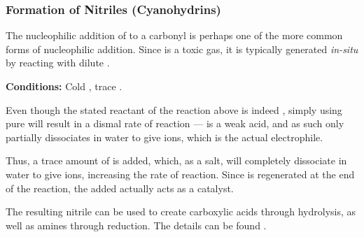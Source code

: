 			\subsubsection{Formation of Nitriles (Cyanohydrins)}

				The nucleophilic addition of  to a carbonyl is perhaps one of the more common forms of nucleophilic addition.
				Since  is a toxic gas, it is typically generated \textit{in-situ} by reacting  with dilute .


				\vspace{-5mm}


				\vspace{1.5em}
				\vbox{\textbf{Conditions:}	\tabto{35mm}Cold , trace .}


				Even though the stated reactant of the reaction above is indeed , simply using pure  will result in a dismal
				rate of reaction ––  is a weak acid, and as such only partially dissociates in water to give  ions, which is
				the actual electrophile.

				Thus, a trace amount of  is added, which, as a salt, will completely dissociate in water to give  ions,
				increasing the rate of reaction. Since  is regenerated at the end of the reaction, the  added actually
				acts as a catalyst.



				The resulting nitrile can be used to create carboxylic acids through hydrolysis, as well as amines through
				reduction. The details can be found \hyperlink{NitrileUses}{}.

